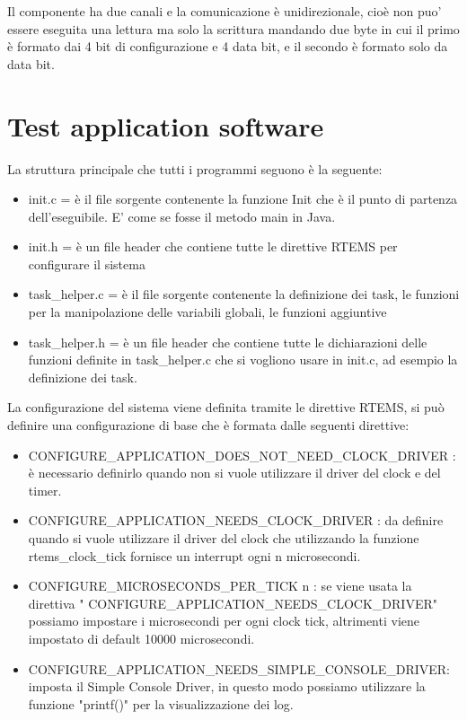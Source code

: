 \documentclass[12pt, a4paper, titlepage, oneside]{book}
\begin{document}
\begin{flushleft}
Il componente ha due canali e la comunicazione è unidirezionale, cioè non puo' essere eseguita una lettura ma solo la scrittura mandando due byte in cui il primo è formato dai 4 bit di configurazione e 4 data bit, e il secondo è formato solo da data bit.


\newpage
\section{Test application software}
La struttura principale che tutti i programmi seguono è la seguente:
\begin{itemize}
    \item init.c = è il file sorgente contenente la funzione Init che è il punto di partenza dell'eseguibile. E' come se fosse il metodo main in Java.
    \item init.h = è un file header che contiene tutte le direttive RTEMS per configurare il sistema
    \item task\_helper.c = è il file sorgente contenente la definizione dei task, le funzioni per la manipolazione delle variabili globali, le funzioni aggiuntive 
    \item task\_helper.h = è un file header che contiene tutte le dichiarazioni delle funzioni definite in task\_helper.c che si vogliono usare in init.c, ad esempio la definizione dei task.
\end{itemize}
La configurazione del sistema viene definita tramite le direttive RTEMS, si può definire una configurazione di base che è formata dalle seguenti direttive:
\begin{itemize}
    \item CONFIGURE\_APPLICATION\_DOES\_NOT\_NEED\_CLOCK\_DRIVER : è necessario definirlo quando non si vuole utilizzare il driver del clock e del timer.
    \item CONFIGURE\_APPLICATION\_NEEDS\_CLOCK\_DRIVER : da definire quando si vuole utilizzare il driver del clock che utilizzando la funzione rtems\_clock\_tick fornisce un interrupt ogni n microsecondi.
    \item CONFIGURE\_MICROSECONDS\_PER\_TICK n  : se viene usata la direttiva " CONFIGURE\_APPLICATION\_NEEDS\_CLOCK\_DRIVER" possiamo impostare i microsecondi per ogni clock tick, altrimenti viene impostato di default 10000  microsecondi.
    \item CONFIGURE\_APPLICATION\_NEEDS\_SIMPLE\_CONSOLE\_DRIVER: imposta il Simple Console Driver, in questo modo possiamo utilizzare la funzione "printf()" per la visualizzazione dei log.

\end{itemize}
\end{flushleft}
\end{document}
